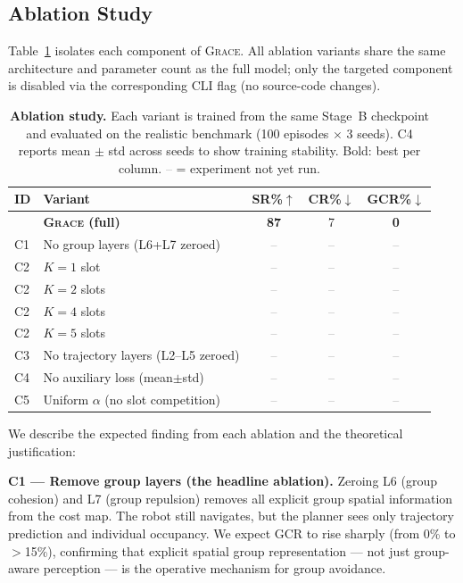\documentclass{article}
\newcommand{\grace}{\textsc{Grace}}
\newcommand{\tbd}{\textcolor{gray}{--}}
\newcommand{\best}[1]{\textbf{#1}}
\begin{document}
\subsection{Ablation Study}
\label{sec:ablation}

Table~\ref{tab:ablation} isolates each component of \grace{}. All ablation
variants share the same architecture and parameter count as the full model;
only the targeted component is disabled via the corresponding CLI flag
(no source-code changes).

\begin{table}[h]
\centering
\caption{\textbf{Ablation study.}
Each variant is trained from the same Stage~B checkpoint and evaluated on the
realistic benchmark (100 episodes $\times$ 3 seeds).
C4 reports mean $\pm$ std across seeds to show training stability.
Bold: best per column. \tbd{} = experiment not yet run.}
\label{tab:ablation}
\small
\setlength{\tabcolsep}{5pt}
\begin{tabular}{llccc}
\toprule
\textbf{ID} & \textbf{Variant} & \textbf{SR\%}$\uparrow$ & \textbf{CR\%}$\downarrow$ & \textbf{GCR\%}$\downarrow$ \\
\midrule
  & \best{\grace{} (full)}             & \best{87} & 7 & \best{0} \\
\midrule
C1 & No group layers (L6+L7 zeroed)     & \tbd & \tbd & \tbd \\
C2 & $K=1$ slot                         & \tbd & \tbd & \tbd \\
C2 & $K=2$ slots                        & \tbd & \tbd & \tbd \\
C2 & $K=4$ slots                        & \tbd & \tbd & \tbd \\
C2 & $K=5$ slots                        & \tbd & \tbd & \tbd \\
C3 & No trajectory layers (L2--L5 zeroed) & \tbd & \tbd & \tbd \\
C4 & No auxiliary loss (mean$\pm$std)   & \tbd & \tbd & \tbd \\
C5 & Uniform $\alpha$ (no slot competition) & \tbd & \tbd & \tbd \\
\bottomrule
\end{tabular}
\end{table}

We describe the expected finding from each ablation and the theoretical
justification:

\textbf{C1 — Remove group layers (the headline ablation).}
Zeroing L6 (group cohesion) and L7 (group repulsion) removes all explicit
group spatial information from the cost map.
The robot still navigates, but the planner sees only trajectory prediction
and individual occupancy.
We expect GCR to rise sharply (from 0\% to $>$15\%), confirming that
explicit spatial group representation — not just group-aware perception — is
the operative mechanism for group avoidance.
\end{document}
